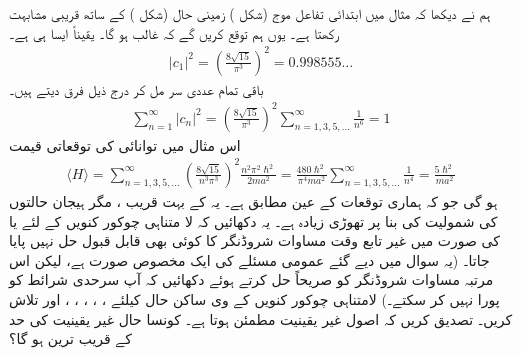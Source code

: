 ہم نے دیکھا کہ مثال  میں ابتدائی تفاعل موج (شکل ) زمینی حال  (شکل ) کے ساتھ قریبی مشابہت رکھتا ہے۔ یوں ہم توقع کریں گے کہ  غالب ہو گا۔ یقیناً ایسا ہی ہے۔
\begin{align*}
\left| c_{1} \right|^{2} = \left( \frac{8\sqrt{15}}{\pi^{3}} \right)^{2} = 0.998555 \dotso
\end{align*}
باقی تمام عددی سر مل کر درج ذیل فرق دیتے ہیں۔
\begin{align*}
\sum_{n=1}^{\infty} \left| c_{n} \right|^{2} = \left( \frac{8\sqrt{15}}{\pi^{3}} \right)^{2} \sum_{n=1,3,5,...}^{\infty} \frac{1}{n^{6}} = 1
\end{align*}
اس مثال میں توانائی کی توقعاتی قیمت
\begin{align*}
\langle H \rangle = \sum_{n=1,3,5,...}^{\infty} \left( \frac{8\sqrt{15}}{n^{3} \pi^{3}} \right)^{2} \frac{n^{2} \pi^{2} \hslash^{2}}{2ma^{2}} = \frac{480\hslash^{2}}{\pi^{4} ma^{2}} \sum_{n=1,3,5,...}^{\infty} \frac{1}{n^{4}} = \frac{5 \hslash^{2}}{ma^{2}}
\end{align*}
 ہو گی جو کہ ہماری توقعات کے عین مطابق  ہے۔  یہ  کے بہت قریب ، مگر ہیجان حالتوں  کی شمولیت کی بنا پر  تھوڑی زیادہ ہے۔ 
یہ دکھائیں کہ لا متناہی چوکور کنویں  کے لئے  یا  کی صورت میں غیر تابع وقت مساوات شروڈنگر کا کوئی بھی قابل قبول حل نہیں پایا جاتا۔ (یہ سوال  میں دیے گئے عمومی مسئلے کی ایک مخصوص صورت ہے، لیکن اس  مرتبہ  مساوات شروڈنگر کو صریحاً حل کرتے ہوئے دکھائیں کہ آپ سرحدی شرائط   کو پورا نہیں کر  سکتے۔)
لامتناہی چوکور کنویں  کے  وی ساکن حال کیلئے ،  ، ، ، ،  اور  تلاش کریں۔ تصدیق کریں کہ اصول غیر یقینیت مطمئن ہوتا ہے۔ کونسا حال غیر یقینیت کی حد کے قریب ترین ہو گا؟
